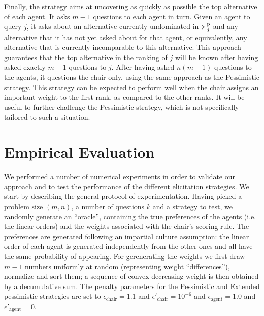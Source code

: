 \documentclass[sigconf, anonymous]{aamas}
\begin{document}
Finally, the  strategy aims at uncovering as quickly as possible the top alternative of each agent. It asks $m - 1$ questions to each agent in turn. 
Given an agent to query $j$, it asks about an alternative currently undominated in $\succ^\text{p}_j$ and any alternative that it has not yet asked about for that agent, or equivalently, any alternative that is currently incomparable to this alternative. This approach guarantees that the top alternative in the ranking of $j$ will be known after having asked exactly $m-1$ questions to $j$.
After having asked $n (m-1)$ questions to the agents, it questions the chair only, using the same approach as the Pessimistic strategy.
This strategy can be expected to perform well when the chair assigns an important weight to the first rank, as compared to the other ranks. It will be useful to further challenge the Pessimistic strategy, which is not specifically tailored to such a situation.


\section{Empirical Evaluation} 
\label{sec:experiments}
We  performed a number of numerical experiments in order to validate our approach and to test the performance of the different elicitation strategies. %
We start by describing the general protocol of experimentation. %
Having picked a problem size $(m, n)$, a number of questions $k$ and a strategy to test, we randomly generate an “oracle”, containing the true preferences of the agents (i.e. the linear orders) and the weights associated with the chair's scoring rule. 
The preferences are generated following an impartial culture assumption: the linear order of each agent is generated independently from the other ones and all have the same probability of appearing. 
For gerenerating the weights we first draw $m-1$ numbers uniformly at random (representing weight ``differences''), normalize and sort them; 
a sequence of convex decreasing weight is then obtained by a decumulative sum.%
The penalty parameters for the Pessimistic and Extended pessimistic strategies are set to $\epsilon_{\text{chair}} = 1.1$ and $\epsilon'_{\text{chair}} = 10^{-6}$ and $\epsilon_{\text{agent}} = 1.0$ and $\epsilon'_{\text{agent}} = 0$.
\end{document}
